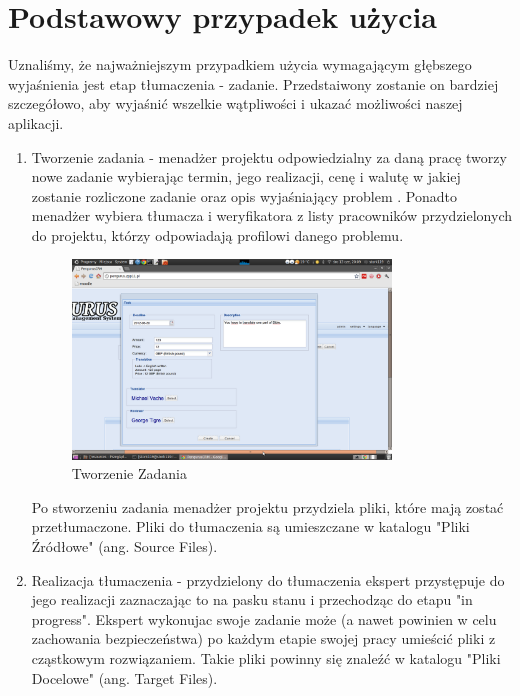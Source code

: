\documentclass[licencjacka]{pracamgr}
\begin{document}
\section{Podstawowy przypadek użycia}
Uznaliśmy, że najważniejszym przypadkiem użycia wymagającym głębszego wyjaśnienia jest etap tłumaczenia - zadanie. Przedstaiwony zostanie on bardziej szczegółowo, aby wyjaśnić wszelkie wątpliwości i ukazać możliwości naszej aplikacji.

\begin{enumerate}
\item Tworzenie zadania - menadżer projektu odpowiedzialny za daną pracę tworzy nowe zadanie wybierając termin, jego realizacji, cenę i walutę w jakiej zostanie rozliczone zadanie oraz opis wyjaśniający problem . Ponadto menadżer wybiera tłumacza i weryfikatora z listy pracowników przydzielonych do projektu, którzy odpowiadają profilowi danego problemu.
\begin{figure}[ht!]
\centering
\includegraphics[width=0.8\textwidth]{resources/task_create.png}
\caption{Tworzenie Zadania}
\end{figure}

Po stworzeniu zadania menadżer projektu przydziela pliki, które mają zostać przetłumaczone. Pliki do tłumaczenia są umieszczane w katalogu "Pliki Źródłowe" (ang. Source Files).
\item Realizacja tłumaczenia - przydzielony do tłumaczenia ekspert przystępuje do jego realizacji zaznaczając to na pasku stanu i przechodząc do etapu "in progress". Ekspert wykonujac swoje zadanie może (a nawet powinien w celu zachowania bezpieczeństwa) po każdym etapie swojej pracy umieścić pliki z cząstkowym rozwiązaniem. Takie pliki powinny się znaleźć w katalogu "Pliki Docelowe" (ang. Target Files).


\end{enumerate}
\end{document}
